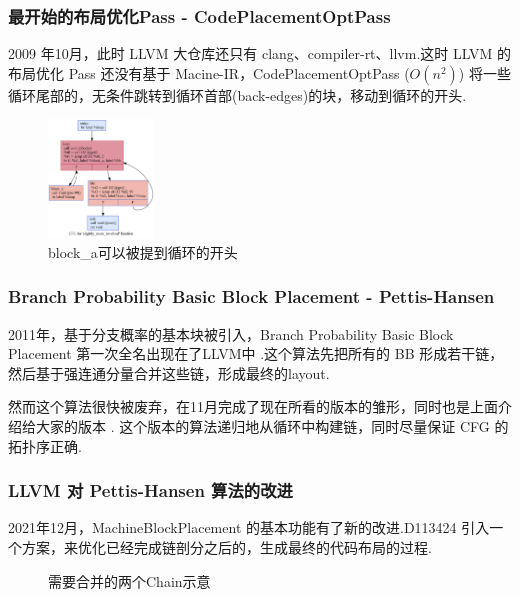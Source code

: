 \begin{frame}
    \frametitle{最开始的布局优化Pass - CodePlacementOptPass}

    2009 年10月，此时 LLVM 大仓库还只有 clang、compiler-rt、llvm.这时 LLVM 的布局优化 Pass 还没有基于 Macine-IR，CodePlacementOptPass ($O(n^2)$) \cite{llvmcodeplacementopt2009}将一些循环尾部的，无条件跳转到循环首部(back-edges)的块，移动到循环的开头.

    \begin{figure}
        \centering
        \includegraphics[width=0.25\textwidth]{images/slightly_more_involved.png}
        \caption{block\_a可以被提到循环的开头}
    \end{figure}

\end{frame}


\begin{frame}
    \frametitle{Branch Probability Basic Block Placement - Pettis-Hansen}

    2011年，基于分支概率的基本块被引入，Branch Probability Basic Block Placement 第一次全名出现在了LLVM中 \cite{llvmmachineblockplacementintro2011}.这个算法先把所有的 BB 形成若干链，然后基于强连通分量合并这些链，形成最终的layout.

    然而这个算法很快被废弃，在11月完成了现在所看的版本的雏形，同时也是上面介绍给大家的版本 \cite{llvmmachineblockplacementimporve2011-1, llvmmachineblockplacementimporve2011-2}. 这个版本的算法递归地从循环中构建链，同时尽量保证 CFG 的拓扑序正确.


    

\end{frame}

\begin{frame}
    \frametitle{LLVM 对 Pettis-Hansen 算法的改进}

    2021年12月，MachineBlockPlacement 的基本功能有了新的改进.D113424\cite{llvmexttspbbl2021} 引入一个方案，来优化已经完成链剖分之后的，生成最终的代码布局的过程.

    \begin{figure}
        
        \caption{需要合并的两个Chain示意}
    \end{figure}

\end{frame}

